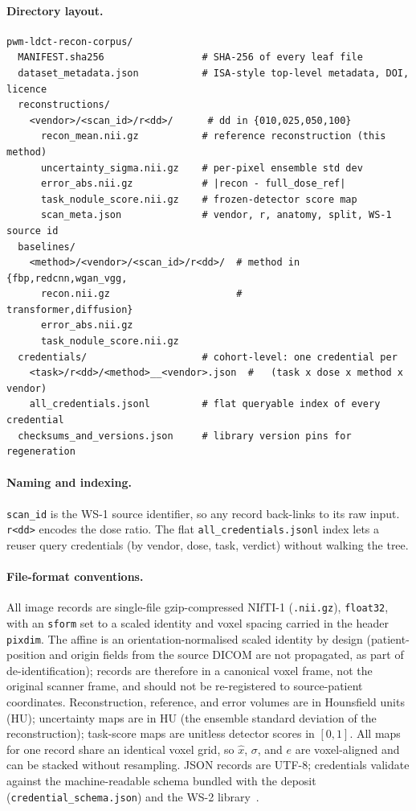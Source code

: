 \documentclass{article}
\begin{document}
\paragraph{Directory layout.}
\begin{verbatim}
pwm-ldct-recon-corpus/
  MANIFEST.sha256                 # SHA-256 of every leaf file
  dataset_metadata.json           # ISA-style top-level metadata, DOI, licence
  reconstructions/
    <vendor>/<scan_id>/r<dd>/      # dd in {010,025,050,100}
      recon_mean.nii.gz           # reference reconstruction (this method)
      uncertainty_sigma.nii.gz    # per-pixel ensemble std dev
      error_abs.nii.gz            # |recon - full_dose_ref|
      task_nodule_score.nii.gz    # frozen-detector score map
      scan_meta.json              # vendor, r, anatomy, split, WS-1 source id
  baselines/
    <method>/<vendor>/<scan_id>/r<dd>/  # method in {fbp,redcnn,wgan_vgg,
      recon.nii.gz                      #            transformer,diffusion}
      error_abs.nii.gz
      task_nodule_score.nii.gz
  credentials/                    # cohort-level: one credential per
    <task>/r<dd>/<method>__<vendor>.json  #   (task x dose x method x vendor)
    all_credentials.jsonl         # flat queryable index of every credential
  checksums_and_versions.json     # library version pins for regeneration
\end{verbatim}

\paragraph{Naming and indexing.} \texttt{scan\_id} is the WS-1 source
identifier, so any record back-links to its raw input. \texttt{r<dd>}
encodes the dose ratio. The flat \texttt{all\_credentials.jsonl} index
lets a reuser query credentials (by vendor, dose, task, verdict) without
walking the tree.

\paragraph{File-format conventions.} All image records are single-file
gzip-compressed NIfTI-1 (\texttt{.nii.gz}), \texttt{float32}, with an
\texttt{sform} set to a scaled identity and voxel spacing carried in the
header \texttt{pixdim}. The affine is an orientation-normalised scaled
identity by design (patient-position and origin fields from the source
DICOM are not propagated, as part of de-identification); records are
therefore in a canonical voxel frame, not the original scanner frame, and
should not be re-registered to source-patient coordinates. Reconstruction,
reference, and error volumes are in
Hounsfield units (HU); uncertainty maps are in HU (the ensemble standard
deviation of the reconstruction); task-score maps are unitless detector
scores in $[0, 1]$. All maps for one record share an identical voxel grid,
so $\hat{x}$, $\sigma$, and $e$ are voxel-aligned and can be stacked
without resampling. JSON records are UTF-8; credentials validate against
the machine-readable schema bundled with the deposit
(\texttt{credential\_schema.json}) and the WS-2 library~\citep{ws2framework}.
\end{document}
